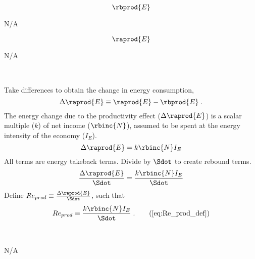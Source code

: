 

\begin{landscape}

\linespread{1}


\sectionsep{}

{
\begin{equation}
  \rbprod{E}
\end{equation}
}
{
\centering

N/A
}

\sectionsep{}

{
\begin{equation}
\raprod{E}
\end{equation}
}
{
\centering

N/A
}

\sectionsep{}

\derivsection{}
{
~

Take differences to obtain the change in energy consumption,
%
\begin{equation}
  \Delta \raprod{E} \equiv \raprod{E} - \rbprod{E} \; .
\end{equation}
%
The energy change due to the productivity effect ($\Delta \raprod{E}$) 
is a scalar multiple ($k$) of net income ($\rbinc{N}$), 
assumed to be spent at the energy intensity of the economy ($I_E$).
%
\begin{equation}
  \Delta \raprod{E} = k \rbinc{N} I_E
\end{equation}
%
All terms are energy takeback terms.
Divide by $\Sdot$
to create rebound terms.
%
\begin{equation}
  \frac{\Delta \raprod{E}}{\Sdot} = \frac{k \rbinc{N} I_E}{\Sdot}
\end{equation}
%
Define 
$Re_{prod} \equiv \frac{\Delta \raprod{E}}{\Sdot}$, 
such that
%
\begin{equation}
  Re_{prod} = \frac{k \rbinc{N} I_E}{\Sdot} \; . \tag{\ref{eq:Re_prod_def}}
\end{equation}
%
}
{
~
\centering

N/A
}
\end{landscape}
